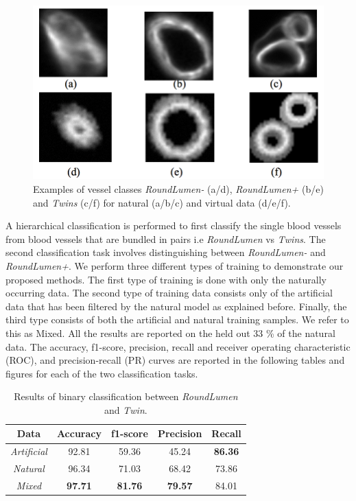 \begin{figure}[ht!]
\centering
\includegraphics[width=1.0\textwidth]{img/slices}
\caption{ Examples of vessel classes \textit{RoundLumen-} (a/d), \textit{RoundLumen+} (b/e) and \textit{Twins} (c/f) for natural (a/b/c) and virtual data (d/e/f).}
\label{fig:slices}
\end{figure}

A hierarchical classification is performed to first classify the single blood vessels from blood vessels that are bundled in pairs i.e \textit{RoundLumen} vs \textit{Twins}. The second classification task involves distinguishing between \textit{RoundLumen-} and \textit{RoundLumen+}. We perform three different types of training to demonstrate our proposed methods. The first type of training is done with only the naturally occurring data. The second type of training data consists only of the artificial data that has been filtered by the natural model as explained before. Finally, the third type consists of both the artificial and natural training samples. We refer to this as Mixed. All the results are reported on the held out 33 \% of the natural data. The accuracy, f1-score, precision, recall and receiver operating characteristic (ROC), and precision-recall (PR) curves are reported in the following tables and figures for each of the two classification tasks. 

\begin{table}[ht!]
\centering
\caption{Results of binary classification between \textit{RoundLumen} and \textit{Twin}.}
\begin{tabular}{ | c | c | c | c | c |} 
\hline
Data & Accuracy & f1-score & Precision & Recall \\ 
\hline
\textit{Artificial} & 92.81& 59.36	& 45.24 & \textbf{86.36} \\ 
\hline
\textit{Natural} & 96.34& 71.03& 68.42& 73.86 \\
\hline
\textit{Mixed} & \textbf{97.71} & \textbf{81.76} & \textbf{79.57} & 84.01 \\
\hline
\end{tabular}
\label{table:results}
\end{table}


